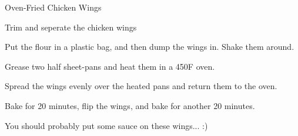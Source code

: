 \documentclass{recipe}
\begin{document}
\begin{recipe}{Oven-Fried Chicken Wings}

  \begin{ingredients}
  \end{ingredients}

  \begin{steps}
  \item Trim and seperate the chicken wings
  \item Put the flour in a plastic bag, and then dump the wings in.
    Shake them around.
  \item Grease two half sheet-pans and heat them in a 450\degree F
    oven.
  \item Spread the wings evenly over the heated pans and return them
    to the oven.
  \item Bake for 20 minutes, flip the wings, and bake for another 20
    minutes.
  \end{steps}

  \begin{notes}
  \item You should probably put some sauce on these wings... :)
  \end{notes}
\end{recipe}
\end{document}
